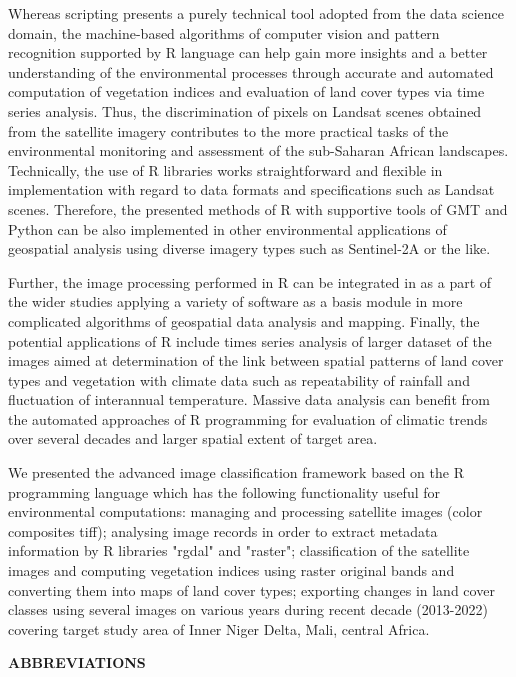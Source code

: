 \documentclass[12pt,a4paper,oneside]{article}
\def \newsection{\vspace{12pt}\textbf}
\def \newpar{\vspace{6pt}}
\begin{document}
\newpar Whereas scripting presents a purely technical tool adopted from the data science domain, the machine-based algorithms of computer vision and pattern recognition supported by R language can help gain more insights and a better understanding of the environmental processes through accurate and automated computation of vegetation indices and evaluation of land cover types via time series analysis. Thus, the discrimination of pixels on Landsat scenes obtained from the satellite imagery contributes to the more practical tasks of the environmental monitoring and assessment of the sub-Saharan African landscapes. Technically, the use of R libraries works straightforward and flexible in implementation with regard to data formats and specifications such as Landsat scenes. Therefore, the presented methods of R with supportive tools of GMT and Python can be also implemented in other environmental applications of geospatial analysis using diverse imagery types such as Sentinel-2A or the like. 

\newpar Further, the image processing performed in R can be integrated in as a part of the wider studies applying a variety of software as a basis module in more complicated algorithms of geospatial data analysis and mapping. Finally, the potential applications of R include times series analysis of larger dataset of the images aimed at determination of the link between spatial patterns of land cover types and vegetation with climate data such as repeatability of rainfall and fluctuation of interannual temperature. Massive data analysis can benefit from the automated approaches of R programming for evaluation of climatic trends over several decades and larger spatial extent of target area.

\newpar We presented the advanced image classification framework based on the R programming language which has the following functionality useful for environmental computations: managing and processing satellite images (color composites tiff); analysing image records in order to extract metadata information by R libraries "rgdal" and "raster"; classification of the satellite images and computing vegetation indices using raster original bands  and converting them into maps of land cover types; exporting changes in land cover classes using several images on various years during recent decade (2013-2022) covering target study area of Inner Niger Delta, Mali, central Africa.

\vspace{12pt}

\newsection {ABBREVIATIONS}
\vspace{12pt}
\end{document}
